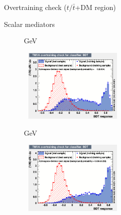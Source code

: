 \documentclass[8pt]{beamer}
\begin{document}
\begin{frame}{Overtraining check ($t/\bar t$+DM region)}
\justifying
\begin{block}{\centering Scalar mediators}\end{block} \vspace{-10pt}
\begin{figure}[htbp]
\centering
\begin{minipage}[b]{.49\textwidth}
\vspace{-5pt}
\begin{block}{ GeV}\end{block}
\begin{center}
\includegraphics[width=5.2cm, height=3.5cm]{figs/overtraining_scalar100_ST.png}
\end{center}
\end{minipage}
\begin{minipage}[b]{.02\textwidth}\end{minipage}
\begin{minipage}[b]{.49\textwidth}
\vspace{-5pt}
\begin{block}{ GeV}\end{block}
\begin{center}
\includegraphics[width=5.2cm, height=3.5cm]{figs/overtraining_scalar500_ST.png}
\end{center}
\end{minipage}
\end{figure} \vfill


\end{frame}
\end{document}
